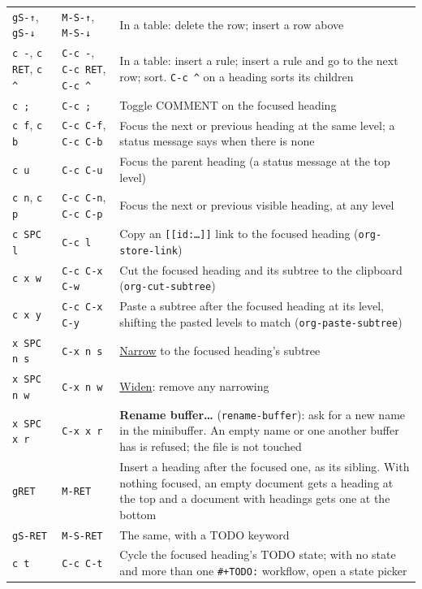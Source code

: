 \documentclass[11pt]{article}
\begin{document}
\begin{center}
\begin{tabular}{lll}
\texttt{gS-↑}, \texttt{gS-↓} & \texttt{M-S-↑}, \texttt{M-S-↓} & In a table: delete the row; insert a row above\\[0pt]
\texttt{c -}, \texttt{c RET}, \texttt{c \textasciicircum{}} & \texttt{C-c -}, \texttt{C-c RET}, \texttt{C-c \textasciicircum{}} & In a table: insert a rule; insert a rule and go to the next row; sort. \texttt{C-c \textasciicircum{}} on a heading sorts its children\\[0pt]
\texttt{c ;} & \texttt{C-c ;} & Toggle COMMENT on the focused heading\\[0pt]
\texttt{c f}, \texttt{c b} & \texttt{C-c C-f}, \texttt{C-c C-b} & Focus the next or previous heading at the same level; a status message says when there is none\\[0pt]
\texttt{c u} & \texttt{C-c C-u} & Focus the parent heading (a status message at the top level)\\[0pt]
\texttt{c n}, \texttt{c p} & \texttt{C-c C-n}, \texttt{C-c C-p} & Focus the next or previous visible heading, at any level\\[0pt]
\texttt{c SPC l} & \texttt{C-c l} & Copy an \texttt{[[id:…]]} link to the focused heading (\texttt{org-store-link})\\[0pt]
\texttt{c x w} & \texttt{C-c C-x C-w} & Cut the focused heading and its subtree to the clipboard (\texttt{org-cut-subtree})\\[0pt]
\texttt{c x y} & \texttt{C-c C-x C-y} & Paste a subtree after the focused heading at its level, shifting the pasted levels to match (\texttt{org-paste-subtree})\\[0pt]
\texttt{x SPC n s} & \texttt{C-x n s} & \hyperref[sec:org4bc1b50]{Narrow} to the focused heading's subtree\\[0pt]
\texttt{x SPC n w} & \texttt{C-x n w} & \hyperref[sec:org4bc1b50]{Widen}: remove any narrowing\\[0pt]
\texttt{x SPC x r} & \texttt{C-x x r} & \textbf{Rename buffer…} (\texttt{rename-buffer}): ask for a new name in the minibuffer. An empty name or one another buffer has is refused; the file is not touched\\[0pt]
\texttt{gRET} & \texttt{M-RET} & Insert a heading after the focused one, as its sibling. With nothing focused, an empty document gets a heading at the top and a document with headings gets one at the bottom\\[0pt]
\texttt{gS-RET} & \texttt{M-S-RET} & The same, with a TODO keyword\\[0pt]
\texttt{c t} & \texttt{C-c C-t} & Cycle the focused heading's TODO state; with no state and more than one \texttt{\#+TODO:} workflow, open a state picker\\[0pt]

\end{tabular}
\end{center}
\end{document}
